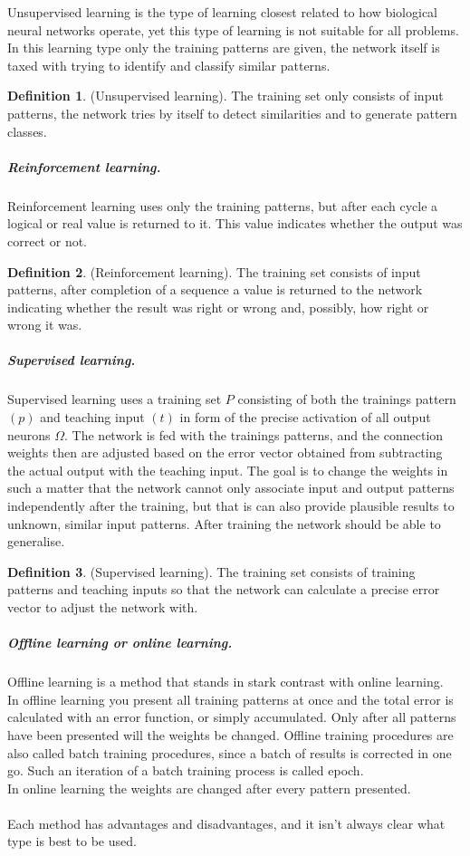 \documentclass[pdftex,a4paper,12pt,twoside]{report}
\theoremstyle{plain} \newtheorem{theorem}{Theorem} \newtheorem{proposition}{Proposition} \newtheorem{lemma}{Lemma} \newtheorem*{corollary}{Corollary}
\theoremstyle{definition} \newtheorem{definition}{Definition} \newtheorem{conjecture}{Conjecture} \newtheorem*{example}{Example} \newtheorem{algorithm}{Algorithm}
\theoremstyle{remark} \newtheorem*{remark}{Remark} \newtheorem*{note}{Note} \newtheorem{case}{Case}
\begin{document}
Unsupervised learning is the type of learning closest related to how biological neural networks operate, yet this type of learning is not suitable for all problems. In this learning type only the training patterns are given, the network itself is taxed with trying to identify and classify similar patterns.
\begin{definition}(Unsupervised learning). The training set only consists of input
patterns, the network tries by itself to detect similarities and to generate pattern
classes.
\end{definition}
\subparagraph{Reinforcement learning.}
Reinforcement learning uses only the training patterns, but after each cycle a logical or real value is returned to it. This value indicates whether the output was correct or not.
\begin{definition}
(Reinforcement learning). The training set consists of input patterns,
after completion of a sequence a value is returned to the network indicating whether
the result was right or wrong and, possibly, how right or wrong it was.
\end{definition}
\subparagraph{Supervised learning.}
Supervised learning uses a training set $P$ consisting of both the trainings pattern $(p)$ and teaching input $(t)$ in form of the precise activation of all output neurons $\Omega$. The network is fed with the trainings patterns, and the connection weights then are adjusted based on the error vector obtained from subtracting the actual output with the teaching input. The goal is to change the weights in such a matter that the network cannot only associate input and output patterns independently after the training, but that is can also provide plausible results to unknown, similar input patterns. After training the network should be able to generalise.
\begin{definition}
(Supervised learning). The training set consists of training patterns and teaching inputs so that the network can calculate a precise error vector to adjust the network with.
\end{definition}
\subparagraph{Offline learning or online learning.}
Offline learning is a method that stands in stark contrast with online learning.\\In offline learning you present all training patterns at once and the total error is calculated with an error function, or simply accumulated. Only after all patterns have been presented will the weights be changed. Offline training procedures are also called batch training procedures, since a batch of results is corrected in one go. Such an iteration of a batch training process is called  epoch.\\In online learning the weights are changed after every pattern presented.\\\\Each method has advantages and disadvantages, and it isn't always clear what type is best to be used. 
\end{document}
